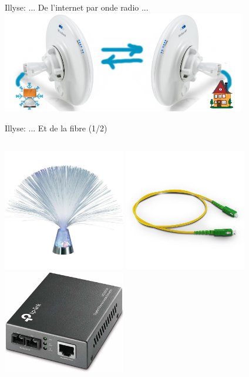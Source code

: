 \begin{frame}{Illyse: \hfill ... De l'internet par onde radio ...\hfill}
  \centering
  \includegraphics[width=0.8\textwidth]{un_autre_internet/antennes.png}
\end{frame}

\begin{frame}{Illyse: \hfill ... Et de la fibre (1/2)}
  \begin{columns}
    \begin{column}{0.5\textwidth}
      \centering
      \includegraphics[width=0.4\textwidth]{un_autre_internet/fibre_1.png}
      \includegraphics[width=0.4\textwidth]{un_autre_internet/fibre_2.png}\\
      \includegraphics[width=0.4\textwidth]{un_autre_internet/fibre_3.png}

\end{column}
\end{columns}
\end{frame}
